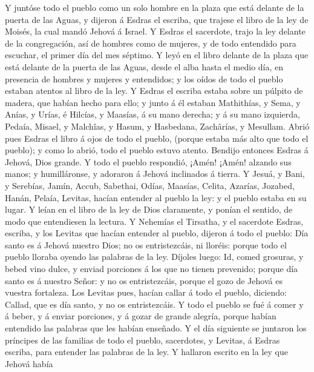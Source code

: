  Y juntóse todo el pueblo como un solo hombre en la plaza
que está delante de la puerta de las Aguas, y dijeron á Esdras el
escriba, que trajese el libro de la ley de Moisés, la cual mandó Jehová
á Israel.  Y Esdras el sacerdote, trajo la ley delante de la
congregación, así de hombres como de mujeres, y de todo entendido para
escuchar, el primer día del mes séptimo.  Y leyó en el libro
delante de la plaza que está delante de la puerta de las Aguas, desde el
alba hasta el medio día, en presencia de hombres y mujeres y entendidos;
y los oídos de todo el pueblo estaban atentos al libro de la ley.
 Y Esdras el escriba estaba sobre un púlpito de madera, que
habían hecho para ello; y junto á él estaban Mathithías, y Sema, y
Anías, y Urías, é Hilcías, y Maasías, á su mano derecha; y á su mano
izquierda, Pedaía, Misael, y Malchîas, y Hasum, y Hasbedana, Zachârías,
y Mesullam.  Abrió pues Esdras el libro á ojos de todo el
pueblo, (porque estaba más alto que todo el pueblo); y como lo abrió,
todo el pueblo estuvo atento.  Bendijo entonces Esdras á
Jehová, Dios grande. Y todo el pueblo respondió, ¡Amén! ¡Amén! alzando
sus manos; y humilláronse, y adoraron á Jehová inclinados á tierra.
 Y Jesuá, y Bani, y Serebías, Jamín, Accub, Sabethai, Odías,
Maasías, Celita, Azarías, Jozabed, Hanán, Pelaía, Levitas, hacían
entender al pueblo la ley: y el pueblo estaba en su lugar. 
Y leían en el libro de la ley de Dios claramente, y ponían el sentido,
de modo que entendiesen la lectura.  Y Nehemías el Tirsatha,
y el sacerdote Esdras, escriba, y los Levitas que hacían entender al
pueblo, dijeron á todo el pueblo: Día santo es á Jehová nuestro Dios; no
os entristezcáis, ni lloréis: porque todo el pueblo lloraba oyendo las
palabras de la ley.  Díjoles luego: Id, comed grosuras, y
bebed vino dulce, y enviad porciones á los que no tienen prevenido;
porque día santo es á nuestro Señor: y no os entristezcáis, porque el
gozo de Jehová es vuestra fortaleza.  Los Levitas pues,
hacían callar á todo el pueblo, diciendo: Callad, que es día santo, y no
os entristezcáis.  Y todo el pueblo se fué á comer y á
beber, y á enviar porciones, y á gozar de grande alegría, porque habían
entendido las palabras que les habían enseñado.  Y el día
siguiente se juntaron los príncipes de las familias de todo el pueblo,
sacerdotes, y Levitas, á Esdras escriba, para entender las palabras de
la ley.  Y hallaron escrito en la ley que Jehová había
